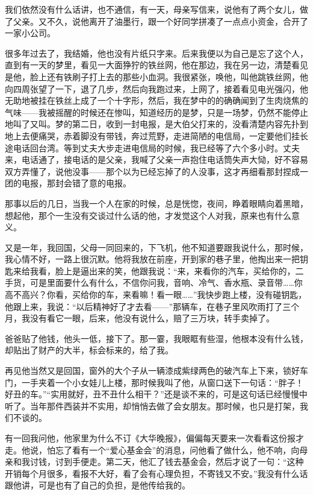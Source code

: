 \par 我们依然没有什么话讲，也不通信，有一天，母亲写信来，说他有了两个女儿，做了父亲。又不久，说他离开了油墨行，跟一个好同学拼凑了一点点小资金，合开了一家小公司。
\par 很多年过去了，我结婚，他也没有片纸只字来。后来我便以为自己是忘了这个人，直到有一天的梦里，看见一大面狰狞的铁丝网，他在那边，我在另一边，清楚看见是他，脸上还有铁刷子打上去的那些小血洞。我很紧张，唤他，叫他跳铁丝网，他向四周张望了一下，退了几步，然后向我跑过来，上网了，接着看见电光强闪，他无助地被挂在铁丝上成了一个十字形，然后，我在梦中的的确确闻到了生肉烧焦的气味——我被摇醒的时候还在惨叫，知道经历的是梦，只是一场梦，仍然不能停止地叫了又叫。梦的第二日，收到一封电报，是大伯父打来的，没看清楚内容先扑到地上去便痛哭，赤着脚没有带钱，奔过荒野，走进简陋的电信局，一定要他们挂长途电话回台湾。等到丈夫大步走进电信局的时候，我已经等了六个多小时。丈夫来，电话通了，接电话的是父亲，我喊了父亲一声抱住电话筒失声大恸，好不容易双方弄懂了，说他没事——那个以为已经忘掉了的人没事，这才再细看那封捏成一团的电报，那封会错了意的电报。
\par 那事以后的几日，当我一个人在家的时候，总是恍惚，夜间，睁着眼睛向着黑暗，想起他，那个一生没有交谈过什么话的他，才发觉这个人对我，原来也有什么意义。
\par 又是一年，我回国，父母一同回来的，下飞机，他不知道要跟我说什么，那时候，我心情不好，一路上很沉默。他将我放在前座，开到家的巷子里，他掏出来一把钥匙来给我看，脸上是逼出来的笑，他跟我说：“来，来看你的汽车，买给你的，二手货，可是里面要什么有什么，不信你问我，音响、冷气、香水瓶、录音带……你高不高兴？你看，买给你的车，来看嘛！看一眼……”我快步跑上楼，没有碰钥匙，他跟上来，我说：“以后精神好了才去看——”那辆车，在巷子里风吹雨打了三个月，我没有看它一眼，后来，他没有说什么，赔了三万块，转手卖掉了。
\par 爸爸贴了他钱，他头一低，接下了。那一霎，我眼眶有些湿，他根本没有什么钱，却贴出了财产的大半，标会标来的，给了我。
\par 再见他当然又是回国，窗外的大个子从一辆漆成紫绿两色的破汽车上下来，锁好车门，一手夹着一个小女娃儿上楼，那时候我叫了他，从窗口送下一句话：“胖子！好丑的车。”“实用就好，丑不丑什么相干？”还是谈不来的，可是这句话已经慢慢中听了。当年那件西装并不实用，却悄悄去做了会女朋友。那时候，也只是打架，我们不谈的。
\par 有一回我问他，他家里为什么不订《大华晚报》，偏偏每天要来一次看看这份报才走。他说，怕忘了看有一个“爱心基金会”的消息，问他看了做什么，他不响，向母亲和我讨钱，讨到手便走。第二天，他汇了钱去基金会，然后才说了一句：“这种开销每个月很多，看报不大好，看了会有心理负担，不寄钱又不安。”我没有什么话跟他讲，可是也有了自己的负担，是他传给我的。
